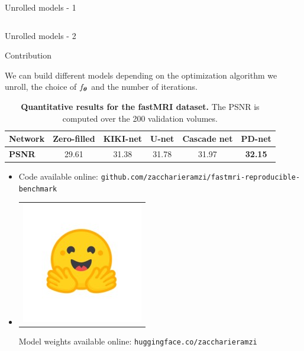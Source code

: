 \begin{frame}{Unrolled models - 1}
\begin{columns}[totalwidth=\textwidth]
\begin{column}[]{0.6\textwidth}
{
            }
        \end{column}
    \end{columns}
\end{frame}


\begin{frame}{Unrolled models - 2}
    \begin{exampleblock}{Contribution}
    \end{exampleblock}
    We can build different models depending on the optimization algorithm we unroll, the choice of $f_{{\boldsymbol{\theta}}}$ and the number of iterations.
    \pause

    \begin{overprint}
        
    
        \begin{table}[h]
            \centering
            \caption{\textbf{Quantitative results for the fastMRI dataset.} The PSNR is computed over the 200 validation volumes.}
            \label{tab:quanti-fastmri}
            \vspace{-0.5em}
            \begin{tabular}{l|c|c|c|c|c}
            \textbf{Network} & \textbf{Zero-filled} & \textbf{KIKI-net} & \textbf{U-net} & \textbf{Cascade net} & \textbf{PD-net} \\ \hline
            \textbf{PSNR} & 29.61 & 31.38 & 31.78 & 31.97 & \textbf{32.15}
            \end{tabular}%
            \end{table}
    
        \begin{itemize}
            \item {} Code available online: \texttt{github.com/zaccharieramzi/fastmri-reproducible-benchmark}
            \item\begin{tabular}{@{}c@{}}\includegraphics[width=3ex]{Figures/hf_logo.jpeg}\end{tabular}Model weights available online: \texttt{huggingface.co/zaccharieramzi}
        \end{itemize}
    

\end{overprint}
\end{frame}
